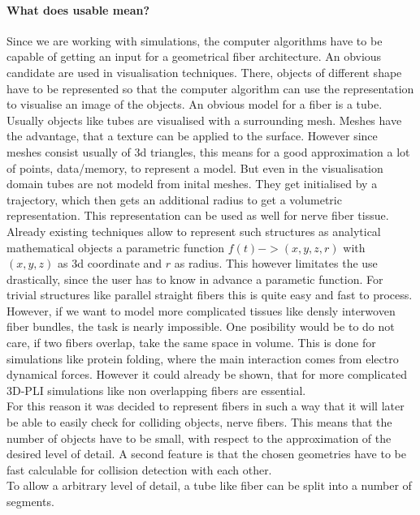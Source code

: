 \paragraph{What does usable mean?}
Since we are working with simulations, the computer algorithms have to be capable of getting an input for a geometrical fiber architecture.
An obvious candidate are used in visualisation techniques.
There, objects of different shape have to be represented so that the computer algorithm can use the representation to visualise an image of the objects.
An obvious model for a fiber is a tube.
Usually objects like tubes are visualised with a surrounding mesh.
Meshes have the advantage, that a texture can be applied to the surface.
However since meshes consist usually of 3d triangles, this means for a good approximation a lot of points, \ie data/memory, to represent a model.
But even in the visualisation domain tubes are not modeld from inital meshes.
They get initialised by a trajectory, which then gets an additional radius to get a volumetric representation.
This representation can be used as well for nerve fiber tissue.
\\
% 
Already existing techniques \dummy allow to represent such structures as analytical mathematical objects \eg a parametric function $f(t) -> (x,y,z,r)$ with $(x,y,z)$ as 3d coordinate and $r$ as radius.
This however limitates the use drastically, since the user has to know in advance a parametic function.
For trivial structures like parallel straight fibers this is quite easy and fast to process.
However, if we want to model more complicated tissues like densly interwoven fiber bundles, the task is nearly impossible.
One posibility would be to do not care, if two fibers overlap, \ie take the same space in volume.
This is done \eg for simulations like protein folding, where the main interaction comes from electro dynamical forces.
However it could already be shown, that for more complicated \ac{3D-PLI} simulations like \dummy non overlapping fibers are essential.
\\
% 
For this reason it was decided to represent fibers in such a way that it will later be able to easily check for colliding objects, \ie nerve fibers.
This means that the number of objects have to be small, with respect to the approximation of the desired level of detail.
A second feature is that the chosen geometries have to be fast calculable for collision detection with each other.
\\
% 
To allow a arbitrary level of detail, a tube like fiber can be split into a number of segments.
